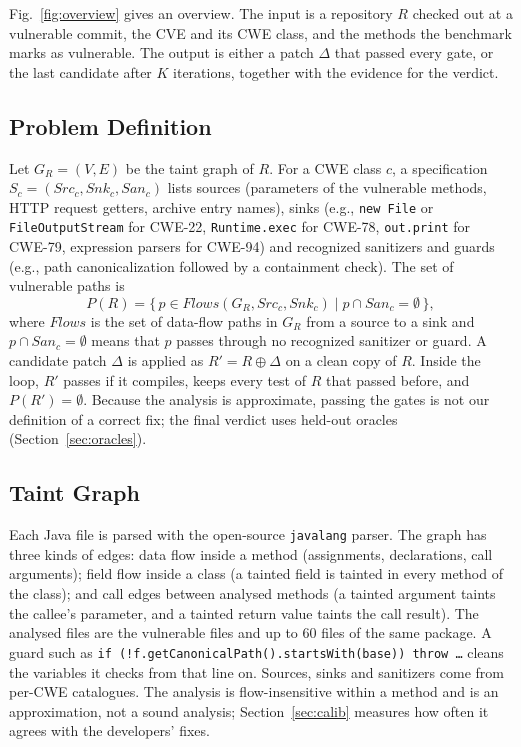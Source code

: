 \documentclass[conference]{IEEEtran}
\newcommand{\code}[1]{\texttt{#1}}
\begin{document}
Fig.~\ref{fig:overview} gives an overview. The input is a repository $R$ checked out at
a vulnerable commit, the CVE and its CWE class, and the methods the benchmark marks as
vulnerable. The output is either a patch $\Delta$ that passed every gate, or the last
candidate after $K$ iterations, together with the evidence for the verdict.

\subsection{Problem Definition}
Let $G_R=(V,E)$ be the taint graph of $R$. For a CWE class $c$, a specification
$S_c=(\mathit{Src}_c, \mathit{Snk}_c, \mathit{San}_c)$ lists sources (parameters of the
vulnerable methods, HTTP request getters, archive entry names), sinks (e.g.,
\code{new File} or \code{FileOutputStream} for CWE-22, \code{Runtime.exec} for CWE-78,
\code{out.print} for CWE-79, expression parsers for CWE-94) and recognized sanitizers and
guards (e.g., path canonicalization followed by a containment check). The set of
vulnerable paths is
\begin{equation}
P(R)=\{\,p\in \mathit{Flows}(G_R,\mathit{Src}_c,\mathit{Snk}_c) \mid
p\cap \mathit{San}_c=\emptyset\,\},
\label{eq:paths}
\end{equation}
where $\mathit{Flows}$ is the set of data-flow paths in $G_R$ from a source to a sink
and $p\cap \mathit{San}_c=\emptyset$ means that $p$ passes through no recognized
sanitizer or guard. A candidate patch $\Delta$ is applied as $R' = R \oplus \Delta$ on a
clean copy of $R$. Inside the loop, $R'$ passes if it compiles, keeps every test of $R$
that passed before, and $P(R')=\emptyset$. Because the analysis is approximate, passing
the gates is not our definition of a correct fix; the final verdict uses held-out
oracles (Section~\ref{sec:oracles}).

\subsection{Taint Graph}
\label{sec:graph}
Each Java file is parsed with the open-source \code{javalang} parser. The graph has three
kinds of edges: data flow inside a method (assignments, declarations, call arguments);
field flow inside a class (a tainted field is tainted in every method of the class);
and call edges between analysed methods (a tainted argument taints the callee's
parameter, and a tainted return value taints the call result). The analysed files are
the vulnerable files and up to 60 files of the same package. A guard such as
\code{if (!f.getCanonicalPath().startsWith(base)) throw \ldots} cleans the variables it
checks from that line on. Sources, sinks and sanitizers come from per-CWE catalogues.
The analysis is flow-insensitive within a method and is an approximation, not a sound
analysis; Section~\ref{sec:calib} measures how often it agrees with the developers'
fixes.
\end{document}
